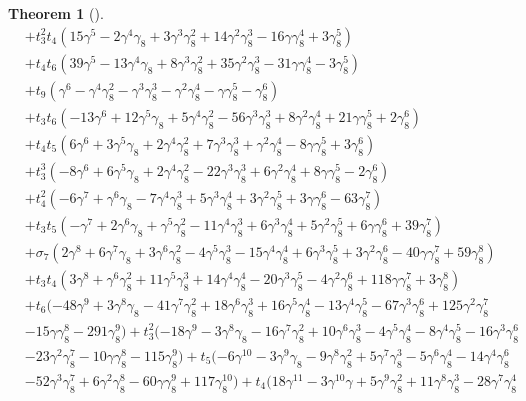 \documentclass{article}
\theoremstyle{plain}
\newtheorem{thm}{Theorem}[section]
\theoremstyle{definition}
\numberwithin{thm}{section}
\begin{document}
\begin{thm}[\cite{nakagawaE8}]
\begin{align*}
					&+t_3^2t_4(15\gamma^5-2\gamma^4\gamma_8+3\gamma^3\gamma_8^2+14\gamma^2\gamma_8^3-16\gamma\gamma_8^4+3\gamma_8^5) \\
					&+t_4t_6(39\gamma^5-13\gamma^4\gamma_8+8\gamma^3\gamma_8^2+35\gamma^2\gamma_8^3-31\gamma\gamma_8^4-3\gamma_8^5) \\
					&+t_9(\gamma^6-\gamma^4\gamma_8^2-\gamma^3\gamma_8^3-\gamma^2\gamma_8^4-\gamma\gamma_8^5-\gamma_8^6) \\
					&+t_3t_6(-13\gamma^6+12\gamma^5\gamma_8+5\gamma^4\gamma_8^2-56\gamma^3\gamma_8^3+8\gamma^2\gamma_8^4+21\gamma\gamma_8^5+2\gamma_8^6) \\
					&+t_4t_5(6\gamma^6+3\gamma^5\gamma_8+2\gamma^4\gamma_8^2+7\gamma^3\gamma_8^3+\gamma^2\gamma_8^4-8\gamma\gamma_8^5+3\gamma_8^6) \\
					&+t_3^3(-8\gamma^6+6\gamma^5\gamma_8+2\gamma^4\gamma_8^2-22\gamma^3\gamma_8^3+6\gamma^2\gamma_8^4+8\gamma\gamma_8^5-2\gamma_8^6) \\
					&+t_4^2(-6\gamma^7+\gamma^6\gamma_8-7\gamma^4\gamma_8^3+5\gamma^3\gamma_8^4+3\gamma^2\gamma_8^5+3\gamma\gamma_8^6-63\gamma_8^7) \\
					&+t_3t_5(-\gamma^7+2\gamma^6\gamma_8+\gamma^5\gamma_8^2-11\gamma^4\gamma_8^3+6\gamma^3\gamma_8^4+5\gamma^2\gamma_8^5+6\gamma\gamma_8^6+39\gamma_8^7) \\
					&+\sigma_7(2\gamma^8+6\gamma^7\gamma_8+3\gamma^6\gamma_8^2-4\gamma^5\gamma_8^3-15\gamma^4\gamma_8^4+6\gamma^3\gamma_8^5+3\gamma^2\gamma_8^6
					 -40\gamma\gamma_8^7+59\gamma_8^8) \\
					&+t_3t_4(3\gamma^8+\gamma^6\gamma_8^2+11\gamma^5\gamma_8^3+14\gamma^4\gamma_8^4-20\gamma^3\gamma_8^5-4\gamma^2\gamma_8^6+118\gamma\gamma_8^7+3\gamma_8^8) \\
					&+t_6(-48\gamma^9+3\gamma^8\gamma_8-41\gamma^7\gamma_8^2+18\gamma^6\gamma_8^3+16\gamma^5\gamma_8^4-13\gamma^4\gamma_8^5-67\gamma^3\gamma_8^6
					 +125\gamma^2\gamma_8^7 \\
					&-15\gamma\gamma_8^8-291\gamma_8^9)
					+t_3^2(-18\gamma^9-3\gamma^8\gamma_8-16\gamma^7\gamma_8^2+10\gamma^6\gamma_8^3-4\gamma^5\gamma_8^4-8\gamma^4\gamma_8^5-16\gamma^3\gamma_8^6 \\
					&-23\gamma^2\gamma_8^7-10\gamma\gamma_8^8-115\gamma_8^9)
					+t_5(-6\gamma^{10}-3\gamma^9\gamma_8-9\gamma^8\gamma_8^2+5\gamma^7\gamma_8^3-5\gamma^6\gamma_8^4-14\gamma^4\gamma_8^6 \\
					&-52\gamma^3\gamma_8^7+6\gamma^2\gamma_8^8-60\gamma\gamma_8^9+117\gamma_8^10) 
					+t_4(18\gamma^{11}-3\gamma^{10}\gamma+5\gamma^9\gamma_8^2+11\gamma^8\gamma_8^3-28\gamma^7\gamma_8^4 \\

\end{align*}
\end{thm}
\end{document}

